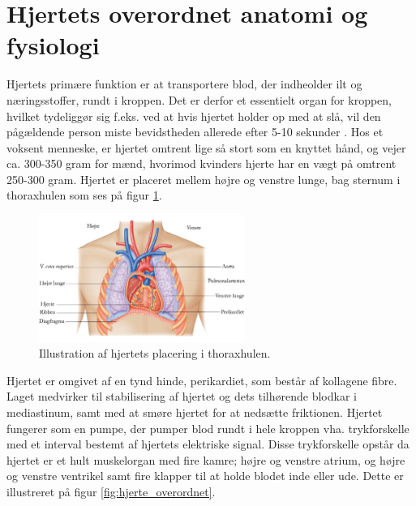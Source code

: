 \section{Hjertets overordnet anatomi og fysiologi}\label{Hjerte_ana_fys}

Hjertets primære funktion er at transportere blod, der indheolder ilt og næringsstoffer, rundt i kroppen. Det er derfor et essentielt organ for kroppen, hvilket tydeliggør sig f.eks. ved at hvis hjertet holder op med at slå, vil den pågældende person miste bevidstheden allerede efter 5-10 sekunder \cite{gronanatomi}. Hos et voksent menneske, er hjertet omtrent lige så stort som en knyttet hånd, og vejer ca. 300-350 gram for mænd, hvorimod kvinders hjerte har en vægt på omtrent 250-300 gram. Hjertet er placeret mellem højre og venstre lunge, bag sternum i thoraxhulen som ses på figur \ref{fig:hjerte_placering}. 

\begin{figure}[H] %
\begin{center}
\includegraphics[width=0.6\textwidth]{figures/thorax}
\end{center}
\caption{Illustration af hjertets placering i thoraxhulen. \cite{cindy}}
\label{fig:hjerte_placering}
\end{figure}

\noindent Hjertet er omgivet af en tynd hinde, perikardiet, som består af kollagene fibre. Laget medvirker til stabilisering af hjertet og dets tilhørende blodkar i mediastinum, samt med at smøre hjertet for at nedsætte friktionen. Hjertet fungerer som en pumpe, der pumper blod rundt i hele kroppen vha. trykforskelle med et interval bestemt af hjertets elektriske signal. Disse trykforskelle opstår da hjertet er et hult muskelorgan med fire kamre; højre og venstre atrium, og højre og venstre ventrikel samt fire klapper til at holde blodet inde eller ude. Dette er illustreret på figur \ref{fig:hjerte_overordnet}. 

